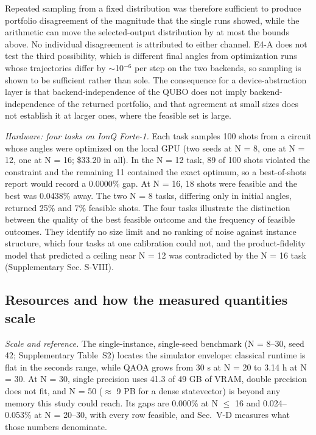 \documentclass{ieeeaccess}
\begin{document}
Repeated sampling from a fixed distribution was therefore sufficient to produce portfolio disagreement of the magnitude that the single runs showed, while the arithmetic can move the selected-output distribution by at most the bounds above. No individual disagreement is attributed to either channel. E4-A does not test the third possibility, which is different final angles from optimization runs whose trajectories differ by $\sim$10$^{-6}$ per step on the two backends, so sampling is shown to be sufficient rather than sole. The consequence for a device-abstraction layer is that backend-independence of the QUBO does not imply backend-independence of the returned portfolio, and that agreement at small sizes does not establish it at larger ones, where the feasible set is large.


\textit{Hardware: four tasks on IonQ Forte-1.} Each task samples 100 shots from a circuit whose angles were optimized on the local GPU (two seeds at N = 8, one at N = 12, one at N = 16; \$33.20 in all). In the N = 12 task, 89 of 100 shots violated the constraint and the remaining 11 contained the exact optimum, so a best-of-shots report would record a 0.0000\% gap. At N = 16, 18 shots were feasible and the best was 0.0438\% away. The two N = 8 tasks, differing only in initial angles, returned 25\% and 7\% feasible shots. The four tasks illustrate the distinction between the quality of the best feasible outcome and the frequency of feasible outcomes. They identify no size limit and no ranking of noise against instance structure, which four tasks at one calibration could not, and the product-fidelity model that predicted a ceiling near N = 12 was contradicted by the N = 16 task (Supplementary Sec. S-VIII).


\subsection{Resources and how the measured quantities scale}


\textit{Scale and reference.} The single-instance, single-seed benchmark (N = 8--30, seed 42; Supplementary Table~S2) locates the simulator envelope: classical runtime is flat in the seconds range, while QAOA grows from 30 s at N = 20 to 3.14 h at N = 30. At N = 30, single precision uses 41.3 of 49 GB of VRAM, double precision does not fit, and N = 50 ($\approx$ 9 PB for a dense statevector) is beyond any memory this study could reach. Its gaps are 0.000\% at N $\leq$ 16 and 0.024--0.053\% at N = 20--30, with every row feasible, and Sec.~V-D measures what those numbers denominate.
\end{document}
